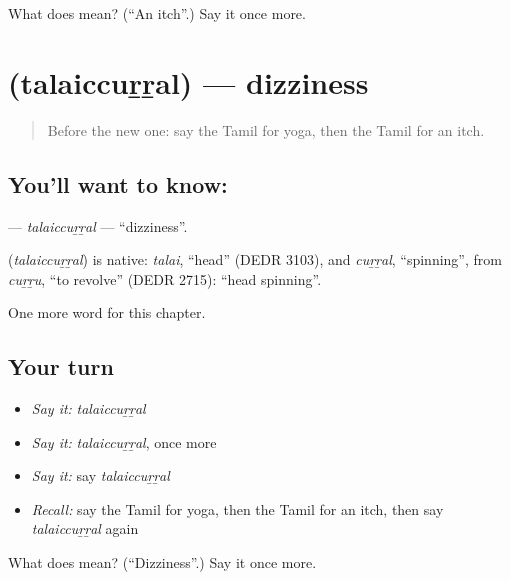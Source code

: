 \begin{tcolorbox}[breakable,colback=teal!4,colframe=teal!35!black,title={Before you move on}]
What does  mean? (\textquotedblleft{}An itch\textquotedblright{}.) Say it once more.
\end{tcolorbox}
\section[\texorpdfstring{\ta{தலைச்சுற்றல்} (talaiccuṟṟal)}{தலைச்சுற்றல் (talaiccuṟṟal)}]{ (talaiccuṟṟal) — dizziness}

\label{lesson:TA-C261-talaiccurral}



\begin{quote}
Before the new one: say the Tamil for yoga, then the Tamil for an itch.
\end{quote}

\subsection*{You'll want to know: }
\textbf{} — \emph{talaiccuṟṟal} — \textquotedblleft{}dizziness\textquotedblright{}.

\begin{cousinweb}
\textbf{} (\emph{talaiccuṟṟal}) is native: \emph{talai}, \textquotedblleft{}head\textquotedblright{} (DEDR 3103), and \emph{cuṟṟal}, \textquotedblleft{}spinning\textquotedblright{}, from \emph{cuṟṟu}, \textquotedblleft{}to revolve\textquotedblright{} (DEDR 2715): \textquotedblleft{}head spinning\textquotedblright{}.
\end{cousinweb}

\begin{grammarlens}[title={What you've built}]
One more word for this chapter.
\end{grammarlens}

\subsection*{Your turn}
\begin{itemize}
\raggedright
  \item \emph{Say it:} \emph{talaiccuṟṟal}
  \item \emph{Say it:} \emph{talaiccuṟṟal}, once more
  \item \emph{Say it:} say \emph{talaiccuṟṟal}
  \item \emph{Recall:} say the Tamil for yoga, then the Tamil for an itch, then say \emph{talaiccuṟṟal} again
\end{itemize}

\begin{tcolorbox}[breakable,colback=teal!4,colframe=teal!35!black,title={Before you move on}]
What does  mean? (\textquotedblleft{}Dizziness\textquotedblright{}.) Say it once more.
\end{tcolorbox}
